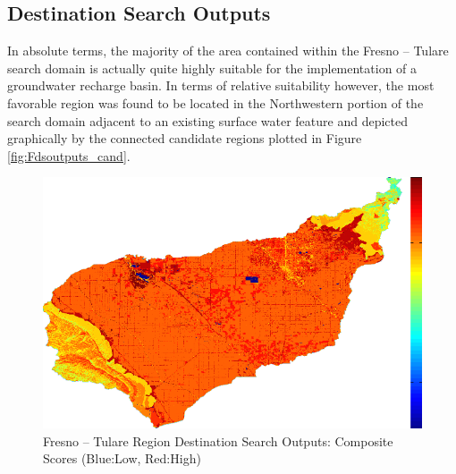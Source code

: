     \subsection{Destination Search Outputs}
    
In absolute terms, the majority of the area contained within the Fresno -- Tulare search domain is actually quite highly suitable for the implementation of a groundwater recharge basin. In terms of relative suitability however, the most favorable region was found to be located in the Northwestern portion of the search domain adjacent to an existing surface water feature and depicted graphically by the connected candidate regions plotted in Figure \ref{fig:Fdsoutputs_cand}. 
    
        \begin{figure}[!h]
            \begin{center}
            \includegraphics[width=5.5in]{figures/Fresno_Search_Composite.png}   
            \caption{Fresno -- Tulare Region Destination Search Outputs: Composite Scores (Blue:Low, Red:High)}
            \label{fig:Fdsoutputs_comp}
            \end{center}
        \end{figure}
        
